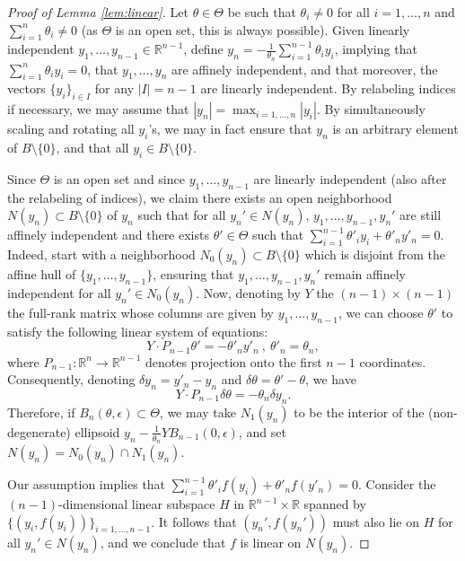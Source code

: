 \documentclass[11pt]{article}
\theoremstyle{definition}
\theoremstyle{proof}
\DeclareMathOperator{\+}{\mathop{\tilde{+}}}
\newcommand{\R}{\mathbb{R}}
\newcommand{\Y}{Y}\newcommand{\E}{\mathbb{E}}
\newcommand{\eps}{\epsilon}
\numberwithin{equation}{section}
\numberwithin{equation}{section}
\begin{document}
\begin{proof}[Proof of Lemma \ref{lem:linear}]
Let $\theta \in \Theta$ be such that $\theta_i \neq 0$ for all $i=1,\ldots,n$ and $\sum_{i=1}^n \theta_i \neq 0$ (as $\Theta$ is an open set, this is always possible). Given linearly independent $y_1,\ldots,y_{n-1} \in \R^{n-1}$, define $y_n = -\frac{1}{\theta_n} \sum_{i=1}^{n-1} \theta_i y_i$, implying that $\sum_{i=1}^n \theta_i y_i = 0$, that $y_1,\ldots,y_n$ are affinely independent, and that moreover, the vectors $\{ y_i \}_{i \in I}$ for any $|I| = n-1$ are linearly independent. By relabeling indices if necessary, we may assume that $|y_n|= \max_{i=1,\ldots,n} |y_i|$.
 By simultaneously scaling and rotating all $y_i$'s, we may in fact ensure that $y_n$ is an arbitrary element of $B \setminus \{0\}$, and that all $y_i \in B \setminus \{0\}$. 
 
 Since $\Theta$ is an open set and since $y_1,\ldots,y_{n-1}$ are linearly independent (also after the relabeling of indices), we claim there exists an open neighborhood $N(y_n) \subset B \setminus \{0\}$ of $y_n$ such that for all $y_n' \in N(y_n)$, $y_1,\ldots,y_{n-1},y_n'$ are still affinely independent and there exists $\theta' \in \Theta$ such that $\sum_{i=1}^{n-1} \theta'_i y_i + \theta'_n y'_n = 0$. 
 Indeed, start with a neighborhood $N_0(y_n) \subset B \setminus \{0\}$ which is disjoint from the affine hull of $\{y_1,\ldots,y_{n-1}\}$, ensuring that $y_1,\ldots,y_{n-1},y_n'$ remain affinely independent for all $y_n' \in N_0(y_n)$. Now, denoting by $\Y$ the $(n-1) \times (n-1)$ the full-rank matrix whose columns are given by $y_1,\ldots,y_{n-1}$, we can choose $\theta'$ to satisfy the following linear system of equations:
\[
\Y \cdot P_{n-1} \theta' = -\theta'_n y'_n ~,~ \theta'_n = \theta_n ,
\]
where $P_{n-1} : \R^n \rightarrow \R^{n-1}$ denotes projection onto the first $n-1$ coordinates. Consequently, denoting $\delta y_n = y'_n - y_n$ and $\delta \theta = \theta' - \theta$, we have
\[
\Y \cdot P_{n-1} \delta \theta = -\theta_n \delta y_n . 
\]
Therefore, if $B_n(\theta,\eps) \subset \Theta$, we may take $N_1(y_n)$ to be the interior of the (non-degenerate) ellipsoid $y_n - \frac{1}{\theta_n} \Y B_{n-1}(0,\eps)$, and set $N(y_n) =N_0(y_n) \cap N_1(y_n)$.

 Our assumption implies that $\sum_{i=1}^{n-1} \theta'_i f(y_i) + \theta'_n f(y'_n) = 0$. Consider the $(n-1)$-dimensional linear subspace $H$ in $\R^{n-1} \times \R$ spanned by $\{(y_i,f(y_i))\}_{i=1,\ldots,n-1}$. It follows that $(y_n' , f(y_n'))$ must also lie on $H$ for all $y_n' \in N(y_n)$, and we conclude that $f$ is linear on $N(y_n)$. 
 

\end{proof}
\end{document}
